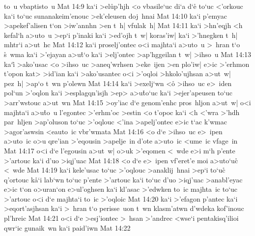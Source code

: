 to~u
vbaptisto~u\bibvsend
\vs Mat 14:9
ka`i
>el\r{u}p'hjh
<o
vbasile`uc
di`a
d`e\r{}
to`uc
<'orkouc
ka`i
to`uc
sunanakeim'enouc
>ek'eleusen
doj~hnai\bibvsend
\vs Mat 14:10
ka`i
p'emyac
>apekef'alisen
t`on
>iw'annhn
>en
t~h|
vfulak~h|\bibvsend
\vs Mat 14:11
ka`i
>hn'eqjh
<h
kefal`h
a>uto~u
>ep`i
p'inaki
ka`i
>ed'ojh
t~w|
koras'iw|
ka`i
>'hnegken
t~h|
mhtr`i
a>ut~hc\bibvsend
\vs Mat 14:12
ka`i
proselj'ontec
o<i
majhta`i
a>uto~u
>~hran
t`o
\r{s}~wma
ka`i
>'ejayan
a>u\r{t}`o
ka`i
>elj'ontec
>ap'hggeilan
t~w|
>ihso~u\bibvsend
\vs Mat 14:13
ka`i\r{}
>ako'usac
<o
>ihso~uc
>aneq'wrhsen
>eke~ijen
>en
plo'iw|
e>ic
>'erhmon
t'opon
kat>
>id'ian
ka`i
>ako'usantec
o<i
>'oqloi
>hkolo'ujhsan
a>ut~w|
pez~h|
>ap`o
t~wn
p'olewn\bibvsend
\vs Mat 14:14
ka`i
>exelj`wn
<o\r{}
>ihso~uc
e>~iden
pol`un
>'oqlon
ka`i
>esplagqn'isjh
>ep>
a>u\r{t}o`uc
ka`i
>ejer'apeusen
to`uc
>arr'wstouc
a>ut~wn\bibvsend
\vs Mat 14:15
>oy'iac
d`e
genom'enhc
pros~hljon
a>ut~w|
o<i
majhta`i
a>u\r{t}o~u
l'egontec
>'erhm'oc
>estin
<o
t'opoc
ka`i
<h
<'wra
>'hdh
par~hljen
>ap'oluson
to`uc
>'oqlouc
<'ina
>apelj'ontec
e>ic
t`ac
k'wmac
>agor'aswsin
<eauto~ic
vbr'wmata\bibvsend
\vs Mat 14:16
<o
d`e
>ihso~uc
e>~ipen
a>uto~ic
o>u
qre'ian
>'eqousin
>apelje~in
d'ote
a>uto~ic
<ume~ic
vfage~in\bibvsend
\vs Mat 14:17
o<i
d`e
l'egousin
a>ut~w|
o>uk
>'eqomen
<~wde
e>i
m`h
p'ente
>'artouc
ka`i
d'uo
>iqj'uac\bibvsend
\vs Mat 14:18
<o
d`e
e>~ipen
vf'eret'e
moi
a>uto`uc\r{}
<~wde\bibvsend
\vs Mat 14:19
ka`i
kele'usac
to`uc
>'oqlouc
>anaklij~hnai
>ep`i
to`uc\r{}
q'ortouc
k\r{a}`i
lab`wn
to`uc
p'ente
>'artouc
ka`i
to`uc
d'uo
>iqj'uac
>anabl'eyac
e>ic
t`on
o>uran`on
e>ul'oghsen
ka`i
kl'asac
>'edwken
to~ic
majhta~ic
to`uc
>'artouc
o<i
d`e
majhta`i
to~ic
>'oqloic\bibvsend
\vs Mat 14:20
ka`i
>'efagon
p'antec
ka`i
>eqort'asjhsan
ka`i
>~hran
t`o
perisse~uon
t~wn
klasm'atwn
d'wdeka
kof'inouc
pl'hreic\bibvsend
\vs Mat 14:21
o<i
d`e
>esj'iontec
>~hsan
>'andrec
<wse`i
pentakisq'ilioi
qwr`ic
gunaik~wn
ka`i
paid'iwn\bibvsend
\vs Mat 14:22
